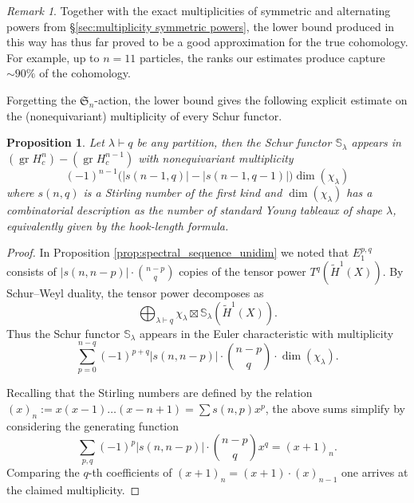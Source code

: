 \documentclass[12pt]{article}
\newcommand{\SymGroup}[1][n]{\mathfrak{S}_{#1}}
\newcommand{\Specht}[1]{\chi_{#1}}
\newcommand{\Schur}[1]{\mathbb{S}_{#1}}
\DeclareMathOperator{\gr}{gr}
\theoremstyle{plain}
\newtheorem{prop}[thm]{Proposition}
\theoremstyle{definition}
\theoremstyle{remark}
\newtheorem{rmk}[thm]{Remark}
\begin{document}
\begin{rmk}
Together with the exact multiplicities of symmetric and alternating powers from \S\ref{sec:multiplicity symmetric powers}, the lower bound produced in this way has thus far proved to be a good approximation for the true cohomology. For example, up to $n=11$ particles, the ranks our estimates produce capture $\sim 90\%$ of the cohomology.
\end{rmk}

Forgetting the $\SymGroup$-action, the lower bound gives the following explicit estimate on the (nonequivariant) multiplicity of every Schur functor.

\begin{prop}
Let $\lambda\vdash q$ be any partition, then the Schur functor $\Schur{\lambda}$ appears in $(\gr H^n_c) - (\gr H^{n-1}_c)$ with nonequivariant multiplicity
    \[
    (-1)^{n-1}\big(|s(n-1,q)|-|s(n-1,q-1)|\big) \dim(\Specht{\lambda})%
    \]
    where $s(n,q)$ is a Stirling number of the first kind and $\dim(\Specht{\lambda})$ has a combinatorial description as the number of standard Young tableaux of shape $\lambda$, equivalently given by the hook-length formula.
\end{prop}

\begin{proof}
    In Proposition \ref{prop:spectral_sequence_unidim} we noted that $E_1^{p,q}$ consists of $|s(n,n-p)|\cdot \binom{n-p}{q}$ copies of the tensor power $T^q(\tilde{H}^1(X))$. By Schur--Weyl duality, the tensor power decomposes as
    \[
    \bigoplus_{\lambda \vdash q} \Specht{\lambda}\boxtimes \Schur{\lambda}(\tilde{H}^1(X)).
    \]
    Thus the Schur functor $\Schur{\lambda}$ appears in the Euler characteristic with multiplicity
    \[
    \sum_{p=0}^{n-q} (-1)^{p+q}|s(n,n-p)|\cdot \binom{n-p}{q}\cdot \dim(\Specht{\lambda}).
    \]
    
    Recalling that the Stirling numbers are defined by the relation $(x)_n:= x(x-1)\ldots(x-n+1) = \sum s(n,p)x^p$, the above sums simplify by considering the generating function
    \[
    \sum_{p,q} (-1)^{p}|s(n,n-p)|\cdot \binom{n-p}{q} x^q = (x+1)_{n}.
    \]
    Comparing the $q$-th coefficients of $(x+1)_n = (x+1)\cdot (x)_{n-1}$ one arrives at the claimed multiplicity.
\end{proof}
\end{document}
